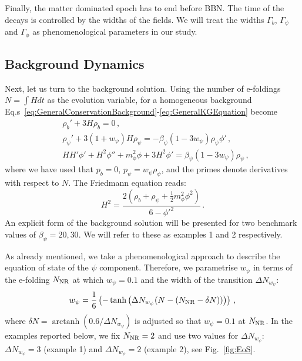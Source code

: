 \documentclass[a4paper, amsfonts, amssymb, amsmath, reprint, showkeys, nofootinbib, twoside, superscriptaddress]{revtex4-1}
\DeclareMathOperator\arctanh{arctanh}
\begin{document}
Finally, the matter dominated epoch has to end before BBN. The time of the decays is controlled by the widths of the fields. We will treat the widths $\Gamma_{b}$, $\Gamma_{\psi}$ and $\Gamma_\phi$ as phenomenological parameters in our study.

\subsection{Background Dynamics}
\label{sec:BackgroundDynamics}

Next, let us turn to the background solution. Using the number of e-foldings $N = \int H dt$ as the evolution variable, for a homogeneous background Eq.s~\eqref{eq:GeneralConservationBackground}-\eqref{eq:GeneralKGEquation}  become
%
\begin{align}
\label{eq:ConservationBackground}
&\rho_b' + 3 H \rho_b = 0 \,, \\
\label{eq:ConservationPsi}
&\rho_\psi' + 3 (1 + w_\psi) H \rho_\psi = - \beta_\psi (1 - 3 w_\psi) \rho_\psi \phi' \,, \\
\label{eq:KGEquation}
&H H' \phi' + H^2 \phi'' + m_\phi^2 \phi + 3 H^2 \phi' = \beta_\psi (1 - 3 w_\psi) \rho_\psi \,,
\end{align}
%
where we have used that $p_b = 0$, $p_\psi = w_\psi \rho_\psi$, and the primes denote derivatives with respect to $N$. The  Friedmann equation reads:
\begin{equation}
H^2 = \frac{2 \left(\rho_b + \rho_\psi + \frac{1}{2} m_\phi^2 \phi^2 \right)}{6 - \phi'^2} \,.
\label{eq:FriedmannEquation}
\end{equation}
An explicit form of the background solution will be presented for two benchmark values of $\beta_{\psi} =20, 30$. We will refer to these as examples 1 and 2 respectively.

As already mentioned, we take a phenomenological approach to describe the equation of state of the $\psi$ component. Therefore, we parametrise $w_\psi$ in terms of the e-folding $N_{\rm NR}$ at which $w_\psi = 0.1$ and the width of the transition $\Delta N_{w_\psi}$:
\begin{equation}
\label{eq:EoS}
w_\psi = \frac{1}{6} \left(- \tanh\left(\Delta N_{w_\psi} (N - (N_{\rm NR} - \delta N))\right)\right) \,,
\end{equation}
where $\delta N = \arctanh(0.6/\Delta N_{w_\psi})$ is adjusted so that $w_\psi = 0.1$ at $N_{\rm NR}$. In the examples reported below, we fix $N_{\rm NR} = 2$ and use two values for $\Delta N_{w_\psi}$: $\Delta N_{w_\psi} = 3$ (example 1) and $\Delta N_{w_\psi} = 2$ (example 2), see Fig.~\ref{fig:EoS}.
\end{document}
